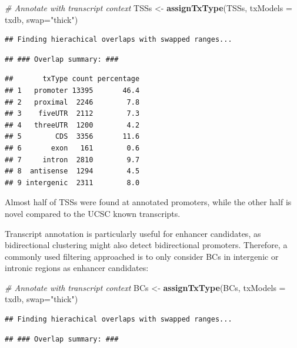 \documentclass[9pt,a4paper,]{extarticle}
\newenvironment{Shaded}{\begin{snugshade}}{\end{snugshade}}
\newcommand{\KeywordTok}[1]{\textcolor[rgb]{0.13,0.29,0.53}{\textbf{{#1}}}}
\newcommand{\DataTypeTok}[1]{\textcolor[rgb]{0.13,0.29,0.53}{{#1}}}
\newcommand{\StringTok}[1]{\textcolor[rgb]{0.31,0.60,0.02}{{#1}}}
\newcommand{\CommentTok}[1]{\textcolor[rgb]{0.56,0.35,0.01}{\textit{{#1}}}}
\newcommand{\NormalTok}[1]{{#1}}
\begin{document}
\begin{Shaded}
\begin{Highlighting}[]
\CommentTok{# Annotate with transcript context}
\NormalTok{TSSs <-}\StringTok{ }\KeywordTok{assignTxType}\NormalTok{(TSSs, }\DataTypeTok{txModels =} \NormalTok{txdb, }\DataTypeTok{swap=}\StringTok{"thick"}\NormalTok{)}
\end{Highlighting}
\end{Shaded}

\begin{verbatim}
## Finding hierachical overlaps with swapped ranges...
\end{verbatim}

\begin{verbatim}
## ### Overlap summary: ###
\end{verbatim}

\begin{verbatim}
##       txType count percentage
## 1   promoter 13395       46.4
## 2   proximal  2246        7.8
## 3    fiveUTR  2112        7.3
## 4   threeUTR  1200        4.2
## 5        CDS  3356       11.6
## 6       exon   161        0.6
## 7     intron  2810        9.7
## 8  antisense  1294        4.5
## 9 intergenic  2311        8.0
\end{verbatim}

Almost half of TSSs were found at annotated promoters, while the other half is novel compared to the UCSC known transcripts.

Transcript annotation is particularly useful for enhancer candidates, as bidirectional clustering might also detect bidirectional promoters. Therefore, a commonly used filtering approached is to only consider BCs in intergenic or intronic regions as enhancer candidates:

\begin{Shaded}
\begin{Highlighting}[]
\CommentTok{# Annotate with transcript context}
\NormalTok{BCs <-}\StringTok{ }\KeywordTok{assignTxType}\NormalTok{(BCs, }\DataTypeTok{txModels =} \NormalTok{txdb, }\DataTypeTok{swap=}\StringTok{"thick"}\NormalTok{)}
\end{Highlighting}
\end{Shaded}

\begin{verbatim}
## Finding hierachical overlaps with swapped ranges...
\end{verbatim}

\begin{verbatim}
## ### Overlap summary: ###
\end{verbatim}
\end{document}
